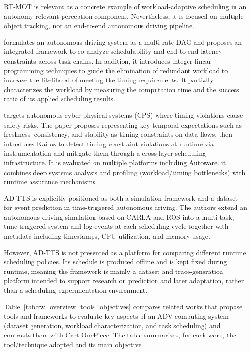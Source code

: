 RT-MOT is relevant as a concrete example of workload-adaptive scheduling in an autonomy-relevant perception component. Nevertheless, it is focused on multiple object tracking, not an end-to-end autonomous driving pipeline.

 formulates an autonomous driving system as a multi-rate DAG and proposes an integrated framework to co-analyze schedulability and end-to-end latency constraints across task chains. In addition, it introduces integer linear programming techniques to guide the elimination of redundant workload to increase the likelihood of meeting the timing requirements. It partially characterizes the workload by measuring the computation time and the success ratio of its applied scheduling results.

 targets autonomous cyber-physical systems (CPS) where timing violations cause safety risks. The paper proposes representing key temporal expectations such as freshness, consistency, and stability as timing constraints on data flows, then introduces Kairos to detect timing constraint violations at runtime via instrumentation and mitigate them through a cross-layer scheduling infrastructure. It is evaluated on multiple platforms including Autoware. it combines deep systems analysis and profiling (workload/timing bottlenecks) with runtime assurance mechanisms.

AD-TTS \cite{Li2025ADTTS} is explicitly positioned as both a simulation framework and a dataset for event prediction in time-triggered autonomous driving. The authors extend an autonomous driving simulation based on CARLA and ROS into a multi-task, time-triggered system and log events at each scheduling cycle together with metadata including timestamps, CPU utilization, and memory usage.

However, AD-TTS is not presented as a platform for comparing different runtime scheduling policies. Its schedule is produced offline and is kept fixed during runtime, meaning the framework is mainly a dataset and trace-generation platform intended to support research on prediction and later adaptation, rather than a scheduling experimentation environment.

Table~\ref{tab:rw_overview_tools_objectives} compares related works that propose tools and frameworks to evaluate key aspects of an ADV computing system (dataset generation, workload characterization, and task scheduling) and contrasts them with Cart-OnePiece. The table summarizes, for each work, the tool/technique adopted and its main objective.

